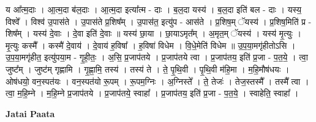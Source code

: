 \documentclass[17pt]{extarticle}
\begin{document}
य आ᳚त्म॒दाः । आ॒त्म॒दा ब॑ल॒दाः । आ॒त्म॒दा इत्या᳚त्म - दाः । ब॒ल॒दा यस्य॑ । ब॒ल॒दा इति॑ बल - दाः । यस्य॒ विश्वे᳚ । विश्व॑ उ॒पास॑ते । उ॒पास॑ते प्र॒शिष᳚म् । उ॒पास॑त॒ इत्यु॑प - आस॑ते । प्र॒शिष॒म् ॅयस्य॑ । प्र॒शिष॒मिति॑ प्र - शिष᳚म् । यस्य॑ दे॒वाः । दे॒वा इति॑ दे॒वाः ॥ यस्य॑ छा॒या । छा॒याऽमृत᳚म् । अ॒मृत॒म् ॅयस्य॑ । यस्य॑ मृ॒त्युः । मृ॒त्युः कस्मै᳚ । कस्मै॑ दे॒वाय॑ । दे॒वाय॑ ह॒विषा᳚ । ह॒विषा॑ विधेम । वि॒धे॒मेति॑ विधेम ॥ उ॒प॒या॒मगृ॑हीतोऽसि । उ॒प॒या॒मगृ॑हीत॒ इत्यु॑पया॒म - गृ॒ही॒तः॒ । अ॒सि॒ प्र॒जाप॑तये । प्र॒जाप॑तये त्वा । प्र॒जाप॑तय॒ इति॑ प्र॒जा - प॒त॒ये॒ । त्वा॒ जुष्ट᳚म् । जुष्ट॑म् गृह्णामि । गृ॒ह्णा॒मि॒ तस्य॑ । तस्य॑ ते । ते॒ पृ॒थि॒वी । पृ॒थि॒वी म॑हि॒मा । म॒हि॒मौष॑धयः । ओष॑धयो॒ वन॒स्पत॑यः । वन॒स्पत॑यो रू॒पम् । रू॒पम॒ग्निः । अ॒ग्निस्ते᳚ । ते॒ तेजः॑ । तेज॒स्तस्मै᳚ । तस्मै᳚ त्वा । त्वा॒ म॒हि॒म्ने । म॒हि॒म्ने प्र॒जाप॑तये । प्र॒जाप॑तये॒ स्वाहा᳚ । प्र॒जाप॑तय॒ इति॑ प्र॒जा - प॒त॒ये॒ । स्वाहेति॒ स्वाहा᳚ । \newline

\textbf{Jatai Paata} \newline
\end{document}
